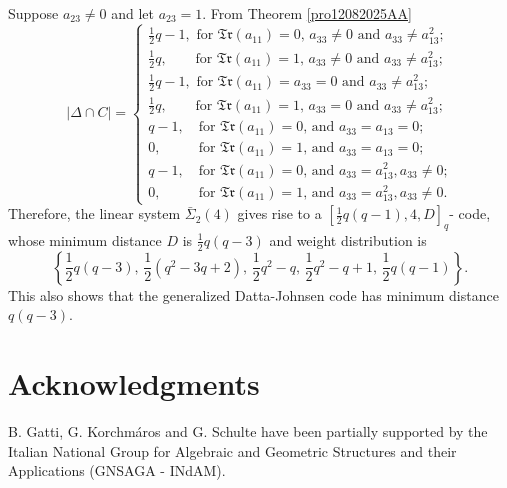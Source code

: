 \documentclass[sn-mathphys-num]{sn-jnl}%
\begin{document}
Suppose $a_{23}\ne 0$ and let $a_{23}=1$. From Theorem \ref{pro12082025AA}
$$ |\Delta\cap C|=
\begin{cases}
\textstyle{\frac{1}{2}}q-1,\,\,{\mbox{for $\mathfrak{Tr}(a_{11})=0$, $a_{33}\ne 0$  and $a_{33}\ne a_{13}^2$; }} \\
\textstyle{\frac{1}{2}}q,\,\,\,\,\,\,\,\,\,\,\,\, {\mbox{for $\mathfrak{Tr}(a_{11})=1$, $a_{33}\ne 0$  and $a_{33}\ne a_{13}^2$; }} \\
\textstyle{\frac{1}{2}}q-1,\,\,{\mbox{for $\mathfrak{Tr}(a_{11})=a_{33}=0$ and $a_{33}\ne a_{13}^2$; }} \\
\textstyle{\frac{1}{2}}q,\,\,\,\,\,\,\,\,\,\,\,\,{\mbox{for $\mathfrak{Tr}(a_{11})=1$, $a_{33}= 0$  and $a_{33}\ne a_{13}^2$; }} \\
q-1,\,\,\,\,\,\,{\mbox{for $\mathfrak{Tr}(a_{11})=0$,   and $a_{33}=a_{13}=0$;}} \\
0,\,\,\quad\,\,\,\,\,\,\,\,{\mbox{for $\mathfrak{Tr}(a_{11})=1$,   and $a_{33}=a_{13}=0$;}} \\
q-1,\,\,\,\,\,\,{\mbox{for $\mathfrak{Tr}(a_{11})=0$,   and $a_{33}=a_{13}^2, a_{33}\ne 0$;}} \\
0,\,\,\quad\,\,\,\,\,\,\,\,{\mbox{for $\mathfrak{Tr}(a_{11})=1$,   and $a_{33}=a_{13}^2, a_{33}\ne 0$.}}
\end{cases}
$$
Therefore, the linear system $\bar{\Sigma}_2(4)$ gives rise to a $\left[\frac{1}{2} q(q-1),4,D\right]_q$- code, whose minimum distance $D$ is $\frac{1}{2}q(q-3)$ and weight distribution is
$$\left\{\textstyle{\frac{1}{2}}q(q-3),\,\textstyle{\frac{1}{2}}(q^2-3q+2),\, \textstyle{\frac{1}{2}}q^2-q,\,\textstyle{\frac{1}{2}}q^2-q+1,\, \textstyle{\frac{1}{2}}q(q-1)\right\}.$$
This also shows that the generalized Datta-Johnsen code has minimum distance $q(q-3)$.

\section{Acknowledgments}
B. Gatti, G. Korchm\'aros and G. Schulte  have been partially supported by the Italian National Group for Algebraic and Geometric Structures and their Applications (GNSAGA - INdAM).



%
\end{document}
